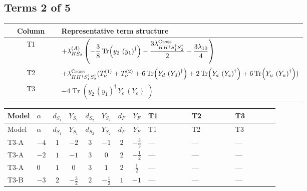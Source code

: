 \documentclass[8pt]{article}
\begin{document}
\begin{landscape}
\subsection*{Terms 2 of 5}
\begin{center}
\begin{tabular}{@{}c >{\raggedright\arraybackslash}p{0.82\linewidth}@{}}
\toprule
Column & Representative term structure \\
\midrule
T1 & \(\displaystyle +{\lambda_{HS_2}^{(A)}} \left(-\frac{3}{8} \operatorname{Tr}\!\left({y_2}\,\left({y_1}\right)^{\dagger}\right)-\frac{3 {\lambda_{H H^\dagger S_1^\dagger S_2^\dagger}^{\rm Cross}}}{2}-\frac{3 {\lambda_{10}}}{4}\right)\) \\
\midrule
T2 & \(\displaystyle +{\lambda_{H H^\dagger S_1^\dagger S_2^\dagger}^{\rm Cross}} (T_{\nu}^{(1)}+T_{\nu}^{(2)}+6 \operatorname{Tr}\!\left({Y_d}\,\left({Y_d}\right)^{\dagger}\right)+2 \operatorname{Tr}\!\left({Y_e}\,\left({Y_e}\right)^{\dagger}\right)+6 \operatorname{Tr}\!\left({Y_u}\,\left({Y_u}\right)^{\dagger}\right))\) \\
\midrule
T3 & \(\displaystyle -4 \operatorname{Tr}\!\left({y_2}\,\left({y_1}\right)^{\dagger}\,{Y_e}\,\left({Y_e}\right)^{\dagger}\right)\) \\
\midrule
\bottomrule
\end{tabular}
\end{center}
\smallskip
\tiny
\begin{longtable}{@{}llcccccc >{\raggedright\arraybackslash}p{0.21\linewidth} >{\raggedright\arraybackslash}p{0.21\linewidth} >{\raggedright\arraybackslash}p{0.21\linewidth}@{}}
\toprule
Model & $\alpha$ & $d_{S_1}$ & $Y_{S_1}$ & $d_{S_2}$ & $Y_{S_2}$ & $d_F$ & $Y_F$ & T1 & T2 & T3 \\
\midrule
\endfirsthead
\toprule
Model & $\alpha$ & $d_{S_1}$ & $Y_{S_1}$ & $d_{S_2}$ & $Y_{S_2}$ & $d_F$ & $Y_F$ & T1 & T2 & T3 \\
\midrule
\endhead
T3-A & $-4$ & $1$ & $-2$ & $3$ & $-1$ & $2$ & $-\frac{3}{2}$ & --- & --- & --- \\
\midrule
T3-A & $-2$ & $1$ & $-1$ & $3$ & $0$ & $2$ & $-\frac{1}{2}$ & --- & --- & --- \\
\midrule
T3-A & $0$ & $1$ & $0$ & $3$ & $1$ & $2$ & $\frac{1}{2}$ & --- & --- & --- \\
\midrule
T3-B & $-3$ & $2$ & $-\frac{3}{2}$ & $2$ & $-\frac{1}{2}$ & $1$ & $-1$ & --- & --- & --- \\
\midrule

\end{longtable}
\end{landscape}
\end{document}
